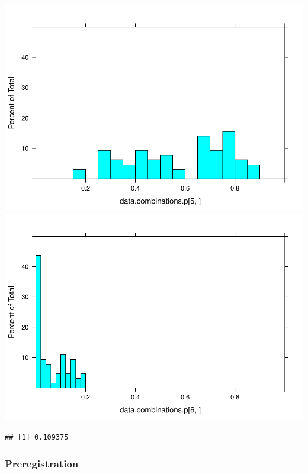 \documentclass[man]{apa6}
\theoremstyle{definition}
\theoremstyle{definition}
\theoremstyle{definition}
\theoremstyle{remark}
\begin{document}
\includegraphics{stats_6_report_files/figure-latex/Data driven multiverse-1.pdf}
\includegraphics{stats_6_report_files/figure-latex/Data driven multiverse-2.pdf}

\begin{verbatim}
## [1] 0.109375
\end{verbatim}

\hypertarget{section}{%
\subsubsection{}\label{section}}

\hypertarget{preregistration}{%
\subsubsection{Preregistration}\label{preregistration}}
\end{document}
